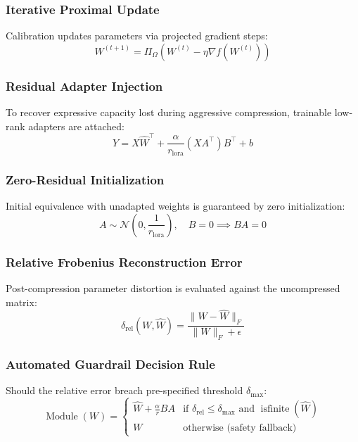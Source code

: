 {\subsubsection{Iterative Proximal Update}
Calibration updates parameters via projected gradient steps:
\begin{equation}
W^{(t+1)} = \Pi_{\Omega}\left( W^{(t)} - \eta \nabla f(W^{(t)}) \right)
\end{equation}

\subsubsection{Residual Adapter Injection}
To recover expressive capacity lost during aggressive compression, trainable low-rank adapters are attached:
\begin{equation}
Y = X \hat{W}^\top + \frac{\alpha}{r_{\text{lora}}} (X A^\top) B^\top + b
\end{equation}

\subsubsection{Zero-Residual Initialization}
Initial equivalence with unadapted weights is guaranteed by zero initialization:
\begin{equation}
A \sim \mathcal{N}\left(0, \frac{1}{r_{\text{lora}}}\right), \quad B = 0 \implies B A = 0
\end{equation}

\subsubsection{Relative Frobenius Reconstruction Error}
Post-compression parameter distortion is evaluated against the uncompressed matrix:
\begin{equation}
\delta_{\text{rel}}(W, \hat{W}) = \frac{\|W - \hat{W}\|_F}{\|W\|_F + \epsilon}
\end{equation}

\subsubsection{Automated Guardrail Decision Rule}
Should the relative error breach pre-specified threshold $\delta_{\text{max}}$:
\begin{equation}
\operatorname{Module}(W) = \begin{cases} \hat{W} + \frac{\alpha}{r} B A & \text{if } \delta_{\text{rel}} \le \delta_{\text{max}} \text{ and } \operatorname{isfinite}(\hat{W}) \\ W & \text{otherwise (safety fallback)} \end{cases}
\end{equation}

}
